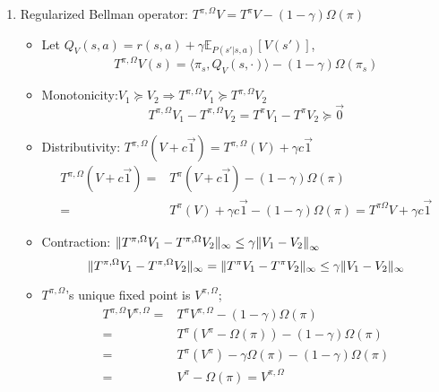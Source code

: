 \documentclass[a4paper]{article}
\begin{document}
\begin{enumerate}
    \item Regularized Bellman operator: $ T^{\pi,\Omega}V = T^{\pi} V - (1-\gamma)\Omega(\pi)$\\
        \begin{itemize}
            \item Let $ Q_V(s,a) = r(s,a) + \gamma \mathbb{E}_{P(s'|s,a)}\left[ V(s') \right] $,
                \[
                    T^{\pi,\Omega}V (s) = \langle \pi_s, Q_V(s, \cdot) \rangle - (1 - \gamma)\Omega(\pi_s)
                \]
            \item Monotonicity:$ V_1 \succeq V_2 \Rightarrow T^{\pi, \Omega}V_1 \succeq T^{\pi, \Omega}V_2 $
                \[
                    T^{\pi, \Omega}V_1 - T^{\pi, \Omega}V_2 = T^{\pi}V_1 - T^{\pi}V_2 \succeq \vec{0}
                \]
            \item Distributivity: $ T^{\pi, \Omega}(V + c \vec{1}) =  T^{\pi, \Omega}(V) + \gamma c \vec{1} $
                \begin{align*}
                    T^{\pi, \Omega}(V + c \vec{1}) =& T^{\pi}(V + c \vec{1}) - (1-\gamma)\Omega(\pi) \\
                    =& T^{\pi}(V) + \gamma c \vec{1} - (1-\gamma)\Omega(\pi) = T^{\pi \Omega}V + \gamma c \vec{1}
                \end{align*}
                \item Contraction: $ \Arrowvert T^{\pi, \Omega}V_1 - T^{\pi, \Omega}V_2 \Arrowvert_{\infty} \le \gamma {\Arrowvert V_1 - V_2 \Arrowvert}_\infty $
                    \[
                        \Arrowvert T^{\pi, \Omega}V_1 - T^{\pi, \Omega}V_2 \Arrowvert_{\infty}
                        = \Arrowvert T^{\pi}V_1 - T^{\pi}V_2 \Arrowvert_{\infty}
                        \le \gamma \Arrowvert V_1 - V_2 \Arrowvert_{\infty}
                    \]
            \item $ T^{\pi,\Omega} $'s unique fixed point is $ V^{\pi, \Omega} $;
                \begin{align*}
                    T^{\pi, \Omega}V^{\pi, \Omega} =& T^{\pi}V^{\pi, \Omega} - (1 - \gamma) \Omega(\pi)\\
                    =& T^{\pi}\left( V^{\pi} - \Omega(\pi) \right) - (1 - \gamma) \Omega(\pi)\\
                    =& T^{\pi}(V^{\pi}) - \gamma \Omega(\pi) - (1-\gamma) \Omega(\pi)\\
                    =& V^{\pi} - \Omega(\pi) = V^{\pi, \Omega}
                \end{align*}
        \end{itemize}

\end{enumerate}
\end{document}

